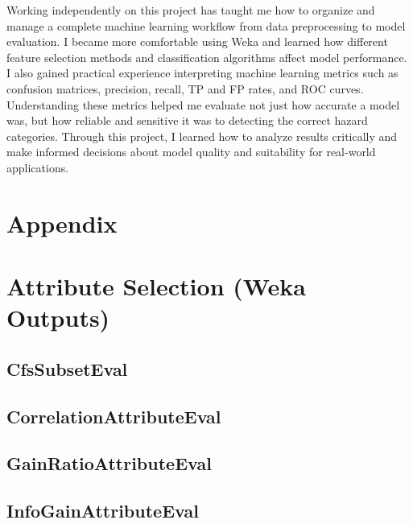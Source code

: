 \documentclass{article}
\begin{document}
Working independently on this project has taught me how to organize and manage a complete machine learning workflow from data preprocessing to model evaluation. 
I became more comfortable using Weka and learned how different feature selection methods and classification algorithms affect model performance. 
I also gained practical experience interpreting machine learning metrics such as confusion matrices, precision, recall, TP and FP rates, and ROC curves. 
Understanding these metrics helped me evaluate not just how accurate a model was, but how reliable and sensitive it was to detecting the correct hazard categories. 
Through this project, I learned how to analyze results critically and make informed decisions about model quality and suitability for real-world applications.



\nocite{*}




\section{Appendix}
\appendix

\section{Attribute Selection (Weka Outputs)}\label{Attribute Selection (Weka Outputs)}

\subsection{CfsSubsetEval}\label{app:CfsSubsetEval weka outputs}


\subsection{CorrelationAttributeEval}\label{app:CorrelationAttributeEval weka outputs}


\subsection{GainRatioAttributeEval}\label{app:GainRatioAttributeEval weka outputs}


\subsection{InfoGainAttributeEval}\label{app:InfoGainAttributeEval weka outputs}

\end{document}
